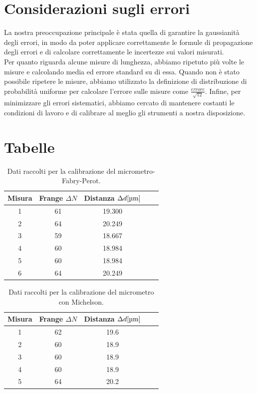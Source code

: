 \documentclass[letterpaper,12pt]{article}
\begin{document}
\section{Considerazioni sugli errori}
\label{sec:errori}

La nostra preoccupazione principale è stata quella di garantire la gaussianità degli errori, in modo da poter
applicare correttamente le formule di propagazione degli errori e di calcolare correttamente le incertezze sui
valori misurati.\\
Per quanto riguarda alcune misure di lunghezza, abbiamo ripetuto più volte le misure e calcolando media ed errore standard su di essa.
Quando non è stato possibile ripetere le misure, abbiamo utilizzato la definizione di distribuzione di probabilità uniforme per calcolare l'errore
sulle misure come $ \frac{errore}{\sqrt{12}} $.
Infine, per minimizzare gli errori sistematici, abbiamo cercato di mantenere costanti le condizioni di lavoro e di calibrare
al meglio gli strumenti a nostra disposizione.\\


\section{Tabelle}

\begin{table}[h!]
    \centering
    \begin{tabular}{|c|c|c|c|c|}
    \hline
    \textbf{Misura} & \textbf{Frange $\Delta N$} & \textbf{Distanza $\Delta d[\text{\SIUnitSymbolMicro m}]$}  \\
    \hline
    1 & 61 & 19.300 \\
    2 & 64 & 20.249 \\
    3 & 59 & 18.667 \\
    4 & 60 & 18.984 \\
    5 & 60 & 18.984 \\
    6 & 64 & 20.249 \\
    \hline
    \end{tabular}
    \caption{Dati raccolti per la calibrazione del micrometro-Fabry-Perot.}
    \label{tab:calibrazione_micrometro}
\end{table}

\begin{table}[h!]
    \centering
    \begin{tabular}{|c|c|c|c|c|}
    \hline
    \textbf{Misura} & \textbf{Frange $\Delta N$} & \textbf{Distanza $\Delta d [\text{\SIUnitSymbolMicro m}]$}  \\
    \hline
    1 & 62 & 19.6 \\
    2 & 60 & 18.9 \\
    3 & 60 & 18.9 \\
    4 & 60 & 18.9 \\
    5 & 64 & 20.2 \\
    \hline
    \end{tabular}
    \caption{Dati raccolti per la calibrazione del micrometro con Michelson.}
    \label{tab:calibrazione_micrometro_michelson}
\end{table}
\end{document}
